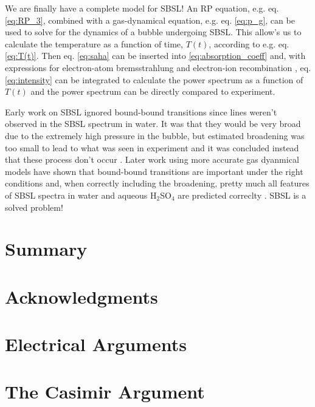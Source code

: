 \documentclass[prb,aps,nofootinbib,superscriptaddress,floatfix]{revtex4-2}
\begin{document}
We are finally have a complete model for SBSL! An RP equation, e.g. eq. \ref{eq:RP_3}, combined with a gas-dynamical equation, e.g. eq. \ref{eq:p_g}, can be used to solve for the dynamics of a bubble undergoing SBSL. This allow's us to calculate the temperature as a function of time, $T(t)$, according to e.g. eq. \ref{eq:T(t)}.  Then eq. \ref{eq:saha} can be inserted into \ref{eq:absorption_coeff} and, with expressions for electron-atom bremsstrahlung \cite{geltman1973free} and electron-ion recombination \cite{hilgenfeldt1999simple,an2006mechanism,an2008spectral,an2009diagnosing,zel2002physics}, eq. \ref{eq:intensity} can be integrated to calculate the power spectrum as a function of $T(t)$ and the power spectrum can be directly compared to experiment.

Early work on SBSL ignored bound-bound transitions since lines weren't observed in the SBSL spectrum in water. It was that they would be very broad due to the extremely high pressure in the bubble, but estimated broadening was too small to lead to what was seen in experiment and it was concluded instead that these process don't occur \cite{hilgenfeldt1999simple,hilgenfeldt1999sonoluminescence}. Later work using more accurate gas dyanmical models have shown that bound-bound transitions are important under the right conditions \cite{an2006mechanism,an2008spectral,an2006mechanism} and, when correctly including the broadening, pretty much all features of SBSL spectra in water and aqueous H$_2$SO$_4$ are predicted correclty \cite{suslick2008inside,flannigan2006measurement,flannigan2005plasma}. SBSL is a solved problem!


\section{Summary}

\section{Acknowledgments}

\appendix
\section{Electrical Arguments}
\section{The Casimir Argument}



\end{document}

